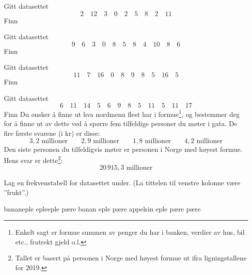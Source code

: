 




\opgt

Gitt datasettet
\[ 2\quad12\quad 3\quad 0\quad 2\quad 5\quad 8\quad2\quad 11 \]
Finn \os
{}

Gitt datasettet
	\[ 9\quad6\quad 3\quad 0\quad 8\quad 5\quad 8\quad4\quad 10\quad 8 \quad 6 \]
Finn \os
{}

Gitt datasettet
\[ 11\quad7\quad 16\quad 0\quad 8\quad 9\quad 8\quad5\quad 16\quad 5 \]
Finn \os
{}

Gitt datasettet
\[ 6\quad11\quad 14\quad 5\quad 6\quad 9\quad 8\quad5\quad 11\quad 5\quad 11\quad 17 \]
Finn \os
{}
\newpage
{}
Du ønsker å finne ut hva nordmenn flest har i formue\footnote{Enkelt sagt er formue summen av penger du har i banken, verdier av hus, bil etc., fratrekt gjeld o.l.}, og bestemmer deg for å finne ut av dette ved å spørre fem tilfeldige personer du møter i gata. De fire første svarene (i kr) er disse:
\[ 3,2\text{ millioner}\qquad 2,9\text{ millioner}\qquad 1,8\text{ millioner}\qquad 4,2\text{ millioner}  \]
Den siste personen du tilfeldigvis møter er personen i Norge med høyest formue. Hens svar er dette\footnote{Tallet er basert på personen i Norge med høyest formue ut ifra ligningstallene for 2019.}:
\[ 20\,915,3\text{ millioner} \]

Lag en frekvenstabell for datasettet under. (La tittelen til venstre kolonne være ''frukt''.)
\begin{center}
	banan\quad eple \quad eple\quad eple \quad pære \quad banan \quad eple \quad pære \quad appelsin \quad eple \quad pære \quad pære
\end{center}

